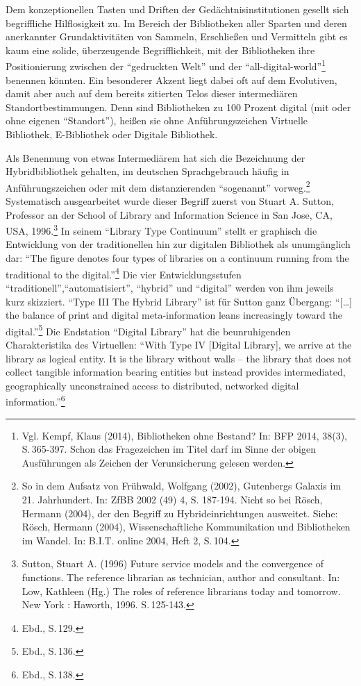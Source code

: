 \documentclass[a4paper,
fontsize=11pt,
oneside,
numbers=noperiodatend,
parskip=half-,
bibliography=totoc,
final
]{scrartcl}
\begin{document}
Dem konzeptionellen Tasten und Driften der Gedächtnisinstitutionen
gesellt sich begriffliche Hilflosigkeit zu. Im Bereich der Bibliotheken
aller Sparten und deren anerkannter Grundaktivitäten von Sammeln,
Erschließen und Vermitteln gibt es kaum eine solide, überzeugende
Begrifflichkeit, mit der Bibliotheken ihre Positionierung zwischen der
\enquote{gedruckten Welt} und der \enquote{all-digital-world}\footnote{Vgl.
  Kempf, Klaus (2014), Bibliotheken ohne Bestand? In: BFP 2014, 38(3),
  S.\,365-397. Schon das Fragezeichen im Titel darf im Sinne der obigen
  Ausführungen als Zeichen der Verunsicherung gelesen werden.} benennen
könnten. Ein besonderer Akzent liegt dabei oft auf dem Evolutiven, damit
aber auch auf dem bereits zitierten Telos dieser intermediären
Standortbestimmungen. Denn sind Bibliotheken zu 100 Prozent digital (mit
oder ohne eigenen \enquote{Standort}), heißen sie ohne Anführungszeichen
Virtuelle Bibliothek, E-Bibliothek oder Digitale Bibliothek.

Als Benennung von etwas Intermediärem hat sich die Bezeichnung der
Hybridbibliothek gehalten, im deutschen Sprachgebrauch häufig in
Anführungszeichen oder mit dem distanzierenden \enquote{sogenannt}
vorweg.\footnote{So in dem Aufsatz von Frühwald, Wolfgang (2002),
  Gutenbergs Galaxis im 21. Jahrhundert. In: ZfBB 2002 (49) 4, S.
  187-194. Nicht so bei Rösch, Hermann (2004), der den Begriff zu
  Hybrideinrichtungen ausweitet. Siehe: Rösch, Hermann (2004),
  Wissenschaftliche Kommunikation und Bibliotheken im Wandel. In: B.I.T.
  online 2004, Heft 2, S.\,104.} Systematisch ausgearbeitet wurde dieser
Begriff zuerst von Stuart A. Sutton, Professor an der School of Library
and Information Science in San Jose, CA, USA, 1996.\footnote{Sutton,
  Stuart A. (1996) Future service models and the convergence of
  functions. The reference librarian as technician, author and
  consultant. In: Low, Kathleen (Hg.) The roles of reference librarians
  today and tomorrow. New York : Haworth, 1996. S.\,125-143.} In seinem
\enquote{Library Type Continuum} stellt er graphisch die Entwicklung von
der traditionellen hin zur digitalen Bibliothek als unumgänglich dar:
\enquote{The figure denotes four types of libraries on a continuum
running from the traditional to the digital.}\footnote{Ebd., S.\,129.}
Die vier Entwicklungsstufen
\enquote{traditionell},\enquote{automatisiert}, \enquote{hybrid} und
\enquote{digital} werden von ihm jeweils kurz skizziert. \enquote{Type
III The Hybrid Library} ist für Sutton ganz Übergang:
\enquote{{[}\ldots{}{]} the balance of print and digital
meta-information leans increasingly toward the digital.}\footnote{Ebd.,
  S.\,136.} Die Endstation \enquote{Digital Library} hat die
beunruhigenden Charakteristika des Virtuellen: \enquote{With Type IV
{[}Digital Library{]}, we arrive at the library as logical entity. It is
the library without walls -- the library that does not collect tangible
information bearing entities but instead provides intermediated,
geographically unconstrained access to distributed, networked digital
information.}\footnote{Ebd., S.\,138.}
\end{document}
